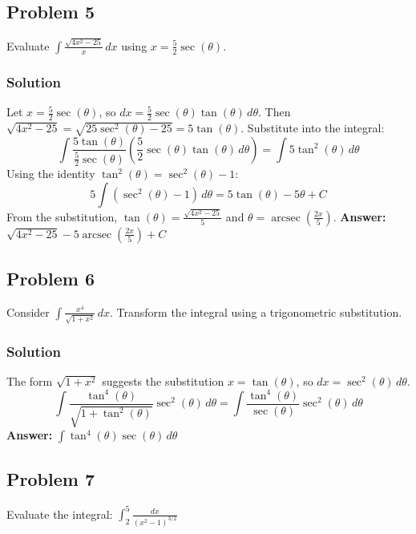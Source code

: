 \documentclass{article}
\begin{document}
\subsection{Problem 5}
Evaluate $ \int \frac{\sqrt{4x^2 - 25}}{x} \,dx $ using $ x = \frac{5}{2} \sec(\theta) $.
\subsubsection*{Solution}
Let $ x = \frac{5}{2} \sec(\theta) $, so $ dx = \frac{5}{2} \sec(\theta)\tan(\theta) \,d\theta $.
Then $ \sqrt{4x^2 - 25} = \sqrt{25\sec^2(\theta) - 25} = 5\tan(\theta) $.
Substitute into the integral:
\[ \int \frac{5\tan(\theta)}{\frac{5}{2}\sec(\theta)} \left(\frac{5}{2}\sec(\theta)\tan(\theta) \,d\theta\right) = \int 5\tan^2(\theta) \,d\theta \]
Using the identity $ \tan^2(\theta) = \sec^2(\theta) - 1 $:
\[ 5 \int (\sec^2(\theta) - 1) \,d\theta = 5\tan(\theta) - 5\theta + C \]
From the substitution, $ \tan(\theta) = \frac{\sqrt{4x^2-25}}{5} $ and $ \theta = \operatorname{arcsec}(\frac{2x}{5}) $.
\textbf{Answer:} $ \sqrt{4x^2 - 25} - 5 \operatorname{arcsec}\left(\frac{2x}{5}\right) + C $


\subsection{Problem 6}
Consider $ \int \frac{x^4}{\sqrt{1 + x^2}} \,dx $. Transform the integral using a trigonometric substitution.
\subsubsection*{Solution}
The form $ \sqrt{1 + x^2} $ suggests the substitution $ x = \tan(\theta) $, so $ dx = \sec^2(\theta) \,d\theta $.
\[ \int \frac{\tan^4(\theta)}{\sqrt{1 + \tan^2(\theta)}} \sec^2(\theta) \,d\theta = \int \frac{\tan^4(\theta)}{\sec(\theta)} \sec^2(\theta) \,d\theta \]
\textbf{Answer:} $ \int \tan^4(\theta)\sec(\theta) \,d\theta $


\subsection{Problem 7}
Evaluate the integral: $ \int_{2}^{5} \frac{dx}{(x^2 - 1)^{3/2}} $
\end{document}
